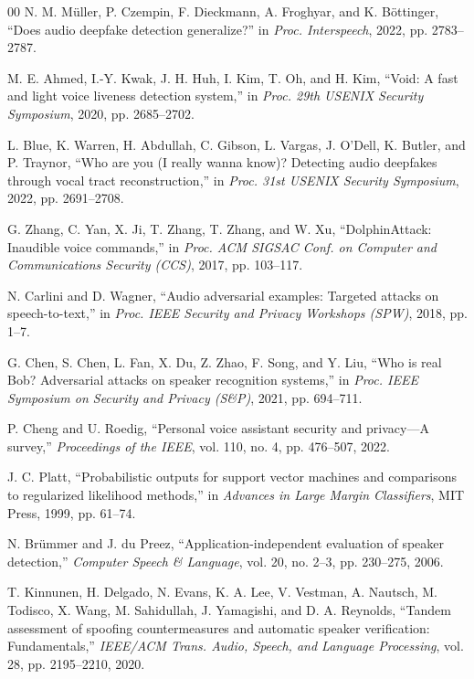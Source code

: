 \documentclass[conference]{IEEEtran}
\begin{document}
\begin{thebibliography}{00}
N. M. M\"uller, P. Czempin, F. Dieckmann, A. Froghyar, and K. B\"ottinger,
``Does audio deepfake detection generalize?''
in \emph{Proc. Interspeech}, 2022, pp. 2783--2787.

M. E. Ahmed, I.-Y. Kwak, J. H. Huh, I. Kim, T. Oh, and H. Kim,
``Void: A fast and light voice liveness detection system,''
in \emph{Proc. 29th USENIX Security Symposium}, 2020, pp. 2685--2702.

L. Blue, K. Warren, H. Abdullah, C. Gibson, L. Vargas, J. O'Dell, K. Butler,
and P. Traynor,
``Who are you (I really wanna know)? Detecting audio deepfakes through vocal
tract reconstruction,''
in \emph{Proc. 31st USENIX Security Symposium}, 2022, pp. 2691--2708.

G. Zhang, C. Yan, X. Ji, T. Zhang, T. Zhang, and W. Xu,
``DolphinAttack: Inaudible voice commands,''
in \emph{Proc. ACM SIGSAC Conf. on Computer and Communications Security (CCS)},
2017, pp. 103--117.

N. Carlini and D. Wagner,
``Audio adversarial examples: Targeted attacks on speech-to-text,''
in \emph{Proc. IEEE Security and Privacy Workshops (SPW)}, 2018, pp. 1--7.

G. Chen, S. Chen, L. Fan, X. Du, Z. Zhao, F. Song, and Y. Liu,
``Who is real Bob? Adversarial attacks on speaker recognition systems,''
in \emph{Proc. IEEE Symposium on Security and Privacy (S\&P)}, 2021,
pp. 694--711.

P. Cheng and U. Roedig,
``Personal voice assistant security and privacy---A survey,''
\emph{Proceedings of the IEEE}, vol. 110, no. 4, pp. 476--507, 2022.

J. C. Platt,
``Probabilistic outputs for support vector machines and comparisons to
regularized likelihood methods,''
in \emph{Advances in Large Margin Classifiers}, MIT Press, 1999, pp. 61--74.

N. Br\"ummer and J. du Preez,
``Application-independent evaluation of speaker detection,''
\emph{Computer Speech \& Language}, vol. 20, no. 2--3, pp. 230--275, 2006.

T. Kinnunen, H. Delgado, N. Evans, K. A. Lee, V. Vestman, A. Nautsch,
M. Todisco, X. Wang, M. Sahidullah, J. Yamagishi, and D. A. Reynolds,
``Tandem assessment of spoofing countermeasures and automatic speaker
verification: Fundamentals,''
\emph{IEEE/ACM Trans. Audio, Speech, and Language Processing}, vol. 28,
pp. 2195--2210, 2020.


\end{thebibliography}
\end{document}
